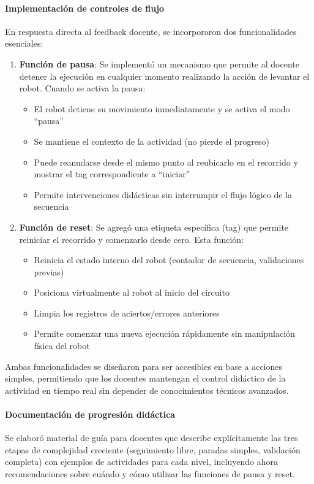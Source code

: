 \documentclass{prgrado}
\begin{document}
\paragraph{Implementación de controles de flujo} En respuesta directa al feedback docente, se incorporaron dos funcionalidades esenciales:
\begin{enumerate}
\item \textbf{Función de pausa}: Se implementó un mecanismo que permite al docente detener la ejecución en cualquier momento realizando la acción de levantar el robot. Cuando se activa la pausa:
\begin{itemize}
\item El robot detiene su movimiento inmediatamente y se activa el modo ``pausa''
\item Se mantiene el contexto de la actividad (no pierde el progreso)
\item Puede reanudarse desde el mismo punto al reubicarlo en el recorrido y mostrar el tag correspondiente a ``iniciar''
\item Permite intervenciones didácticas sin interrumpir el flujo lógico de la secuencia
\end{itemize}
\item \textbf{Función de reset}: Se agregó una etiqueta específica (tag) que permite reiniciar el recorrido y comenzarlo desde cero. Esta función:
\begin{itemize}
\item Reinicia el estado interno del robot (contador de secuencia, validaciones previas)
\item Posiciona virtualmente al robot al inicio del circuito
\item Limpia los registros de aciertos/errores anteriores
\item Permite comenzar una nueva ejecución rápidamente sin manipulación física del robot
\end{itemize}
\end{enumerate}
Ambas funcionalidades se diseñaron para ser accesibles en base a acciones simples, permitiendo que los docentes mantengan el control didáctico de la actividad en tiempo real sin depender de conocimientos técnicos avanzados.
\paragraph{Documentación de progresión didáctica} Se elaboró material de guía para docentes que describe explícitamente las tres etapas de complejidad creciente (seguimiento libre, paradas simples, validación completa) con ejemplos de actividades para cada nivel, incluyendo ahora recomendaciones sobre cuándo y cómo utilizar las funciones de pausa y reset.
\end{document}
